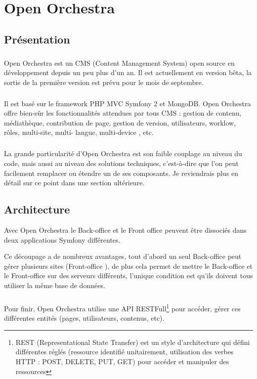 \chapter{Open Orchestra}
\section{Présentation}
        \paragraph{}
        Open Orchestra est un CMS (Content Management  System) open source en développement depuis un peu plus d'un an. Il est actuellement en version bêta, la sortie de la première version est prévu pour le mois de septembre.
        \paragraph{}
        Il est basé sur le framework PHP MVC Symfony 2 et MongoDB. Open Orchestra offre bien-sûr les fonctionnalités attendues par tous CMS : gestion de contenu, médiathèque, contribution de page, gestion de version, utilisateurs, worklow, rôles,  multi-site, multi- langue,  multi-device , etc.
        \paragraph{}
        La grande particularité d'Open Orchestra est son faible couplage au niveau du code, mais aussi au niveau des solutions techniques, c'est-à-dire que l'on peut facilement remplacer ou étendre un de ses composants. Je reviendrais plus en détail sur ce point dans une section ultérieure.
        
        \section{Architecture}
       Avec Open Orchestra le \og Back-office \fg{} et le \og Front office \fg{} peuvent être dissociés dans deux applications Symfony différentes. 

        Ce découpage a de nombreux avantages, tout d'abord un seul \og Back-office \fg{}  peut gérer plusieurs sites (\og Front-office \fg{}), de plus cela permet de mettre le \og Back-office \fg{} et le \og Front-office \fg{} sur des serveurs différents, l'unique condition est qu'ils doivent tous utiliser la même base de données.
        \paragraph{}
		Pour finir, Open Orchestra utilise une API RESTFull\footnote{REST (Representational State Transfer) est un style d'architecture qui défini différentes réglés (ressource identifié unitairement, utilisation des verbes HTTP :  POST, DELETE, PUT, GET) pour accéder et manipuler des ressources } pour  accéder, gérer ces différentes entités (pages, utilisateurs, contenus, etc).
